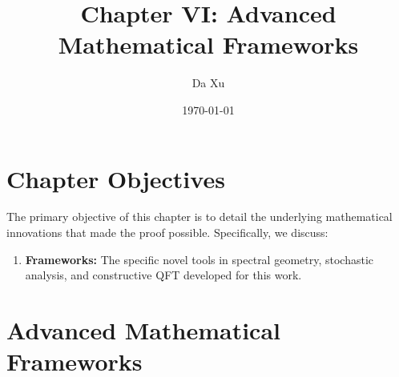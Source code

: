 \documentclass[11pt,a4paper]{report}
\title{Chapter VI: Advanced Mathematical Frameworks}
\author{Da Xu}
\date{\today}
\begin{document}
\hypersetup{pageanchor=false}
\maketitle
\hypersetup{pageanchor=true}

\chapter*{Chapter Objectives}
The primary objective of this chapter is to detail the underlying mathematical innovations that made the proof possible. Specifically, we discuss:
\begin{enumerate}
    \item \textbf{Frameworks:} The specific novel tools in spectral geometry, stochastic analysis, and constructive QFT developed for this work.
\end{enumerate}

\tableofcontents

\chapter{Advanced Mathematical Frameworks}
\label{ch:advanced_math_frameworks}
















\nocite{*}
\printbibliography[heading=subbibliography, title={References for Chapter 6}]
\end{document}
